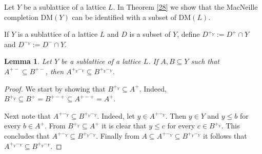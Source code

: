\documentclass[12pt,a4paper]{amsart}
\numberwithin{equation}{section}
\newtheorem{lem}[thm]{Lemma}
\theoremstyle{definition}
\newcommand{\lattice}{L}
\newcommand{\DM}{\text{DM}}
\begin{document}
Let $Y$ be a sublattice of a lattice $\lattice$.  In Theorem \ref{28} we show that the MacNeille completion $\DM(Y)$ can be identified with a subset of $\DM(L)$.  

If $Y$ is a sublattice of a lattice $\lattice$ and $ D$ is a  subset of $Y$, define $ D^{+_{Y}}:= D^+\cap Y$ and $ D^{-_{Y}}:= D^-\cap Y$.





\begin{lem}\label{24}
Let $Y$ be a sublattice of a lattice $\lattice$.  If $A,B \subseteq Y$ such that $A^{+-} \subseteq B^{+-}$, then $A^{+_{Y} -_{Y} }\subseteq  B^{+_{Y} -_{Y}}$.
\end{lem}
\begin{proof}
	We start by showing that $B^{+_{Y}} \subseteq A^{+}$. Indeed, $B^{+_{Y}} \subseteq B^{+} = B^{+-+} \subseteq A^{+-+} = A^{+}$.
	
   Next note that $A^{+-_{Y}} \subseteq B^{+_{Y}-_{Y}}$. Indeed, let $y \in A^{+-_{Y}}$. Then $y \in Y$ and $y \leq b$ for every $b \in A^{+}$. From $B^{+_{Y}} \subseteq A^{+}$ it is clear that $y \leq c$ for every $c \in B^{+_{Y}}$. This concludes that $A^{+-_{Y}} \subseteq B^{+_{Y} -_{Y}}$. Finally from $A \subseteq A^{+-_{Y}} \subseteq B^{+_{Y} -_{Y}}$ it follows that $ A^{+_{Y} -_{Y}} \subseteq  B^{+_{Y} -_{Y}}$.
\end{proof}	
\end{document}
